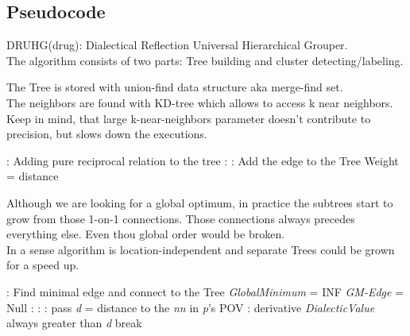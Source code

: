 \documentclass[12pt, a4paper, twocolumn]{article}
\begin{document}
\begin{appendices}
\section{Pseudocode}\label{Pseudocode}

DRUHG(\foreignlanguage{russian}{drug}): Dialectical Reflection Universal Hierarchical Grouper.
\\ The algorithm consists of two parts: Tree building and cluster detecting/labeling.

The Tree is stored with union-find data structure aka merge-find set.\cite{strUF}
\\ The neighbors are found with KD-tree\cite{strKDtree} which allows to access k near neighbors. Keep in mind, that large k-near-neighbors parameter doesn't contribute to precision, but slows down the executions.

\begin{algorithm}
  \begin{algorithmic}[1]
    : \Comment Adding pure reciprocal relation to the tree
      :
        :
            \State Add the edge to the Tree 
            \State Weight = distance
        \EndIf
      \EndFor
    \EndProcedure
  \end{algorithmic}
  \end{algorithm}

Although we are looking for a global optimum, in practice the subtrees start to grow from those 1-on-1 connections. Those connections always precedes everything else. Even thou global order would be broken. 
\\ In a sense algorithm is location-independent and separate Trees could be grown for a speed up. 

  \begin{algorithm}[h]
    \begin{algorithmic}[2]
      : \Comment Find minimal edge and connect to the Tree
        \Repeat
          \State \textit{GlobalMinimum} = INF
          \State \textit{GM-Edge} = Null
          :
            :
              :
                \State pass
              \EndIf
              \State \textit{d} = distance to the \textit{nn} in \textit{p}'s POV
              :
                \State \indent derivative \textit{DialecticValue} always greater than \textit{d}
                \State break
              \EndIf


\end{algorithmic}
\end{algorithm}
\end{appendices}
\end{document}
